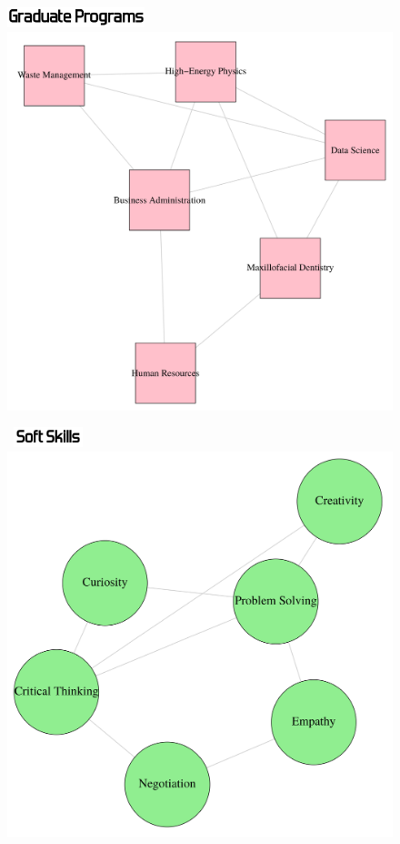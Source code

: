 \documentclass{article}
\begin{document}
\begin{figure}[htbp]
  \centering
  \begin{minipage}[t]{.45\textwidth}
\includegraphics[width=4cm]{GraduatePrograms.png}    \includegraphics[scale=.32]{2B.pdf}
    \label{fig:figure1}
  \end{minipage}
  \hfill
  \begin{minipage}[t]{.45\textwidth}
~\includegraphics[width=2cm]{SoftSkills.png}    \includegraphics[scale=.32]{2A.pdf}

\end{minipage}
\end{figure}
\end{document}
